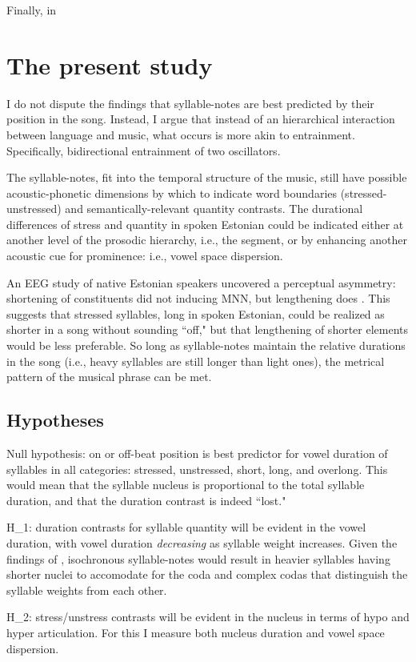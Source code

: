 Finally, in %

\section{The present study}

I do not dispute the findings that syllable-notes are best predicted by their position in the song. Instead, I argue that instead of an hierarchical interaction between language and music, what occurs is more akin to entrainment. Specifically, bidirectional entrainment of two oscillators. 

The syllable-notes, fit into the temporal structure of the music, still have possible acoustic-phonetic dimensions by which to indicate word boundaries (stressed-unstressed) and semantically-relevant quantity contrasts.  The durational differences of stress and quantity in spoken Estonian could be indicated either at another level of the prosodic hierarchy, i.e.,  the segment, or by enhancing another acoustic cue for prominence: i.e.,  vowel space dispersion. 


An EEG study of native Estonian speakers uncovered a perceptual asymmetry: shortening of constituents did not inducing MNN, but lengthening does \citep{eestiMNNasymmetry}. This suggests that stressed syllables, long in spoken Estonian, could be realized as shorter in a song without sounding ``off," but that lengthening of shorter elements would be less preferable. So long as syllable-notes maintain the relative durations in the song (i.e., heavy syllables are still longer than light ones), the metrical pattern of the musical phrase can be met. 

\subsection{Hypotheses}
Null hypothesis: on or off-beat position is best predictor for vowel duration of syllables in all categories: stressed, unstressed, short, long, and overlong. This would mean that the syllable nucleus is proportional to the total syllable duration, and that the duration contrast is indeed ``lost." 

H_{1}: duration contrasts for syllable quantity will be evident in the vowel duration, with vowel duration {\it decreasing} as syllable weight increases. Given the findings of \citep{rossLehiste2001}, isochronous syllable-notes would result in heavier syllables having shorter nuclei to accomodate for the coda and complex codas that distinguish the syllable weights from each other. 

H_{2}: stress/unstress contrasts will be evident in the nucleus in terms of hypo and hyper articulation. For this I measure both nucleus duration and vowel space dispersion. 


